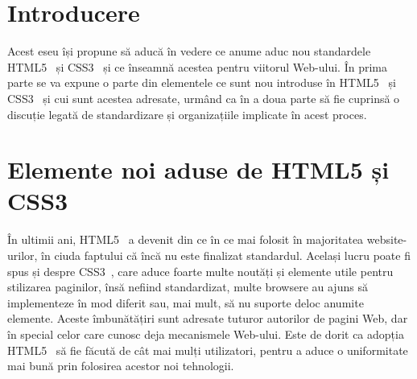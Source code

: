 \documentclass[12pt]{article} %
\begin{document}

\tableofcontents %

\newpage %


\section{Introducere} %

Acest eseu își propune să aducă în vedere ce anume aduc nou standardele HTML5~\cite{website:html5} și
CSS3~\cite{website:css3} și ce înseamnă acestea pentru viitorul Web-ului. În prima parte se va expune o
parte din elementele ce sunt nou introduse în HTML5~\cite{website:html5} și CSS3~\cite{website:css3} și
cui sunt acestea adresate, urmând ca în a doua parte să fie cuprinsă o discuție legată de standardizare
și organizațiile implicate în acest proces.


\section{Elemente noi aduse de HTML5 și CSS3}

În ultimii ani, HTML5~\cite{website:html5} a devenit din ce în ce mai folosit în majoritatea website-urilor,
în ciuda faptului că încă nu este finalizat standardul. Același lucru poate fi spus și despre
CSS3~\cite{website:css3}, care aduce foarte multe noutăți și elemente utile pentru stilizarea paginilor,
însă nefiind standardizat, multe browsere au ajuns să implementeze în mod diferit sau, mai mult, să nu suporte
deloc anumite elemente. Aceste îmbunătățiri sunt adresate tuturor autorilor de pagini Web, dar în special
celor care cunosc deja mecanismele Web-ului. Este de dorit ca adopția HTML5~\cite{website:html5} să fie făcută
de cât mai mulți utilizatori, pentru a aduce o uniformitate mai bună prin folosirea acestor noi tehnologii.
\end{document}
